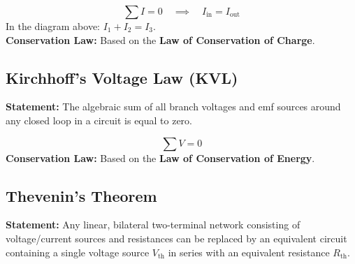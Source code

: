\documentclass[11pt,a4paper]{article}
\begin{document}
\begin{center}
\end{center}

\begin{formulabox}
    \[ \sum I = 0 \quad \implies \quad I_{\text{in}} = I_{\text{out}} \]
    In the diagram above: $I_1 + I_2 = I_3$. \\[0.15cm]
    \textbf{Conservation Law:} Based on the \textbf{Law of Conservation of Charge}.
\end{formulabox}

\subsection{Kirchhoff's Voltage Law (KVL)}
\begin{pyqbox}
    \textbf{Statement:} The algebraic sum of all branch voltages and emf sources around any closed loop in a circuit is equal to zero.
\end{pyqbox}

\begin{formulabox}
    \[ \sum V = 0 \]
    \textbf{Conservation Law:} Based on the \textbf{Law of Conservation of Energy}.
\end{formulabox}

\subsection{Thevenin's Theorem}
\begin{pyqbox}
    \textbf{Statement:} Any linear, bilateral two-terminal network consisting of voltage/current sources and resistances can be replaced by an equivalent circuit containing a single voltage source $V_{\text{th}}$ in series with an equivalent resistance $R_{\text{th}}$.
\end{pyqbox}
\end{document}
